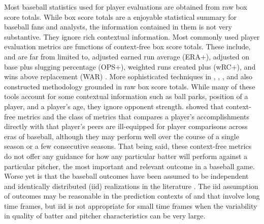 \documentclass[11pt]{article}
\begin{document}
Most baseball statistics used for player evaluations are obtained from raw box score totals. While box score totals are a enjoyable statistical summary for baseball fans and analysts, the information contained in them is not very substantive. They ignore rich contextual information. Most commonly used player evaluation metrics are functions of context-free box score totals. These include, and are far from limited to, adjusted earned run average (ERA+), adjusted on base plus slugging percentage (OPS+), weighted runs created plus (wRC+), and wins above replacement (WAR) \citep{bref, fangraphs}. More sophisticated techniques in \citet{berry1999bridging}, \citet{brown2008season}, \cite{jensen2009hierarchical}, and \cite{baumer2015openwar} also constructed methodology grounded in raw box score totals. While many of these tools account for some contextual information such as ball parks, position of a player, and a player's age, they ignore opponent strength. %
\cite{eck2020challenging} showed that context-free metrics and the class of metrics that compares a player's accomplishments directly with that player's peers are ill-equipped for player comparisons across eras of baseball, although they may perform well over the course of a single season or a few consecutive seasons. That being said, these context-free metrics do not offer any guidance for how any particular batter will perform against a particular pitcher, the most important and relevant outcome in a baseball game. Worse yet is that the baseball outcomes have been assumed to be independent and identically distributed (iid) realizations in the literature \citep{brown2008season, jensen2009hierarchical}. The iid assumption of outcomes may be reasonable in the prediction contexts of \cite{brown2008season} and \cite{jensen2009hierarchical} that involve long time frames, but iid is not appropriate for small time frames when the variability in quality of batter and pitcher characteristics can be very large.




%
\end{document}
